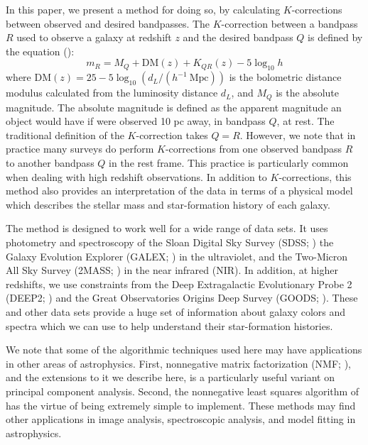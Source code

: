 \documentclass[10pt,preprint]{aastex}
\begin{document}
In this paper, we present a method for doing so, by calculating
$K$-corrections between observed and desired bandpasses.  The
$K$-correction between a bandpass $R$ used to observe a galaxy at
redshift $z$ and the desired bandpass $Q$ is defined by the equation
(\citealt{oke68a, hogg02a}):
\begin{equation}
m_R = M_Q + \mathrm{DM}(z) + K_{QR}(z) - 5 \log_{10} h 
\end{equation}
where $\mathrm{DM}(z) = 25 - 5\log_{10} (d_L / (h^{-1}{\mathrm{~Mpc}}))$ is the
bolometric distance modulus calculated from the luminosity distance
$d_L$, and $M_Q$ is the absolute magnitude. The absolute magnitude is
defined as the apparent magnitude an object would have if were
observed 10 pc away, in bandpass $Q$, at rest.  The traditional
definition of the $K$-correction takes $Q=R$. However, we note that in
practice many surveys do perform $K$-corrections from one observed
bandpass $R$ to another bandpass $Q$ in the rest frame. This practice
is particularly common when dealing with high redshift observations.
In addition to $K$-corrections, this method also provides an
interpretation of the data in terms of a physical model which
describes the stellar mass and star-formation history of each galaxy.

The method is designed to work well for a wide range of data sets.  It
uses photometry and spectroscopy of the Sloan Digital Sky Survey
(SDSS; \citealt{york00a}) the Galaxy Evolution Explorer (GALEX;
\citealt{martin05a}) in the ultraviolet, and the Two-Micron All Sky
Survey (2MASS; \citealt{skrutskie97a}) in the near infrared (NIR). In
addition, at higher redshifts, we use constraints from the Deep
Extragalactic Evolutionary Probe 2 (DEEP2; \citealt{davis03a,
faber03a}) and the Great Observatories Origins Deep Survey (GOODS;
\citealt{giavalisco04a}).  These and other data sets provide a huge
set of information about galaxy colors and spectra which we can use to
help understand their star-formation histories.

We note that some of the algorithmic techniques used here may have
applications in other areas of astrophysics. First, nonnegative matrix
factorization (NMF; \citealt{lee00a}), and the extensions to it we
describe here, is a particularly useful variant on principal component
analysis. Second, the nonnegative least squares algorithm of
\citet{sha02a} has the virtue of being extremely simple to implement.
These methods may find other applications in image analysis, spectroscopic
analysis, and model fitting in astrophysics.
\end{document}
